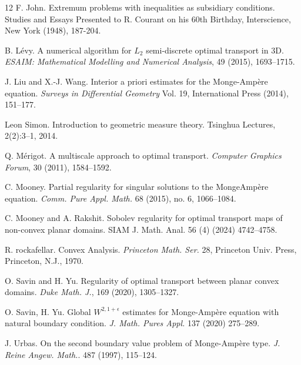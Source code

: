 \documentclass[11pt]{amsart}
\theoremstyle{plain}
\newcommand{\0}{\textbf{0}}
\numberwithin{equation}{section}
\numberwithin{equation}{section}
\numberwithin{figure}{section}
\begin{document}
\begin{thebibliography}{12}
	 F. John. Extremum problems with inequalities as subsidiary conditions. Studies and Essays Presented to R. Courant on his 60th Birthday, Interscience, New York (1948), 187-204.
		
	 B. L\'evy.
	A numerical algorithm for $L_2$ semi-discrete optimal transport in 3D.
	\emph{ESAIM: Mathematical Modelling and Numerical Analysis}, 49 (2015), 1693--1715. 
	
	J. Liu and X.-J. Wang.
	Interior a priori estimates for the Monge-Amp\`{e}re equation.  
	\emph{Surveys in Differential Geometry} Vol. 19, International Press (2014), 151–177.
	
	Leon Simon. Introduction to geometric measure theory. Tsinghua Lectures, 2(2):3–1, 2014.
	
	
	 Q. M\'erigot.
	A multiscale approach to optimal transport.
	\emph{Computer Graphics Forum}, 30 (2011), 1584--1592. 
	
	C. Mooney.
	Partial regularity for singular solutions to the MongeAmp\`{e}re equation. 
	\emph{Comm. Pure Appl. Math.} 68 (2015), no. 6, 1066--1084.
	
	C. Mooney and A. Rakshit.
	Sobolev regularity for optimal transport maps of non-convex planar domains. SIAM J. Math. Anal. 56 (4) (2024) 4742–4758. 
	
	R. rockafellar. 
	Convex Analysis. \emph{Princeton Math. Ser.} 28, Princeton Univ. Press, Princeton, N.J., 1970. 
	
	O. Savin and H. Yu.
	Regularity of optimal transport between planar convex domains. 
	\textit{Duke Math. J.}, 169 (2020), 1305--1327.
	
	O. Savin, H. Yu. 
	Global $W^{2,1+\epsilon}$ estimates for Monge-Amp\`{e}re equation with natural boundary condition.
	\emph{J. Math. Pures Appl.} 137 (2020) 275–289. 
	
	 J. Urbas.
	On the second boundary value problem of Monge-Amp\`ere type.
	\textit{J. Reine Angew. Math.}.  487 (1997), 115--124.
	
	
	
\end{thebibliography}
\end{document}
